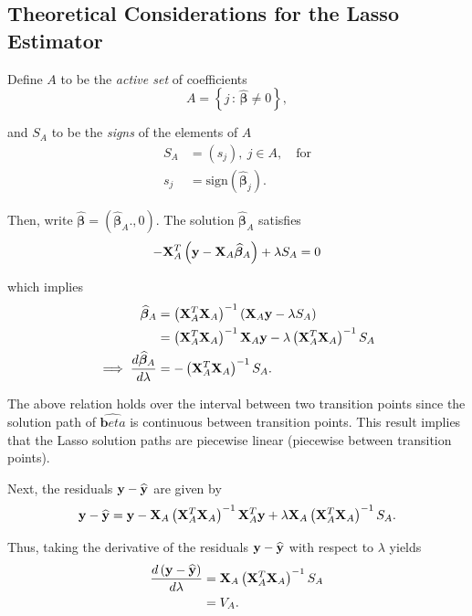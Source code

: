 \documentclass[twoside]{article}
\begin{document}
\subsection{Theoretical Considerations for the Lasso Estimator}

Define $A$ to be the {\em active set} of coefficients
\begin{equation*}
	A = \left\{ j\,:\, \widehat{\bm \beta} \neq 0 \right\},
\end{equation*}

and $S_A$ to be the {\em signs} of the elements of $A$
\begin{align*}
	S_A &= \left(s_j\right),~ j \in A, \quad \text{for} \\
	s_j &= \text{sign} \left( \widehat {\bm \beta}_j \right).
\end{align*}

Then, write $\widehat {\bm \beta} = \left(\widehat {\bm \beta}_A., 0\right)$. The solution $\widehat {\bm \beta}_A$ satisfies 
\begin{equation*}
	-{\bf X}^T_A \left({\bf y} - {\bf X}_A \widehat {\bm \beta}_A \right) + \lambda S_A = 0
\end{equation*}

which implies
\begin{align*}
	\widehat {\bm \beta}_A &= \left({\bf X}^T_A {\bf X}_A  \right)^{-1} \left({\bf X}_A  {\bf y} - \lambda S_A\right) \\
	&= \left({\bf X}^T_A {\bf X}_A  \right)^{-1} {\bf X}_A  {\bf y} - \lambda \left({\bf X}^T_A {\bf X}_A  \right)^{-1} S_A  \\
\implies \frac{d \widehat {\bm \beta}_A}{d\lambda} &= -\left({\bf X}^T_A {\bf X}_A  \right)^{-1} S_A.
\end{align*}

The above relation holds over the interval between two transition points since the solution path of $\widehat{\bm beta}$ is continuous between transition points. This result implies that the Lasso solution paths are piecewise linear (piecewise between transition points).

Next, the residuals ${\bf y} - \widehat{\bf y}$ are given by
\begin{equation*}
	{\bf y} - \widehat{\bf y} = {\bf y} - {\bf X}_A \left( {\bf X}^T_A {\bf X}_A \right)^{-1} {\bf X}^T_A {\bf y} + \lambda {\bf X}_A \left( {\bf X}^T_A {\bf X}_A \right)^{-1} S_A.
\end{equation*}	

Thus, taking the derivative of the residuals ${\bf y} - \widehat{\bf y}$ with respect to $\lambda$ yields
\begin{align*}
	\frac{d \left({\bf y} - \widehat{\bf y}\right)}{d\lambda} &= {\bf X}_A \left( {\bf X}^T_A {\bf X}_A \right)^{-1} S_A \\
	&= V_A.
\end{align*}
\end{document}
